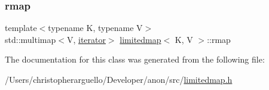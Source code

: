 \mbox{\label{classlimitedmap_ab4a6f5b1572ee3754d53f7773b381eb2}} 
\subsubsection{\texorpdfstring{rmap}{rmap}}
{\footnotesize\ttfamily template$<$typename K, typename V$>$ \\
std\+::multimap$<$V, \mbox{\hyperlink{classlimitedmap_aea661213ab6f699e9667bea25bf99821}{iterator}}$>$ \mbox{\hyperlink{classlimitedmap}{limitedmap}}$<$ K, V $>$\+::rmap\hspace{0.3cm}{\ttfamily [protected]}}



The documentation for this class was generated from the following file\+:\begin{DoxyCompactItemize}
\item 
/\+Users/christopherarguello/\+Developer/anon/src/\mbox{\hyperlink{limitedmap_8h}{limitedmap.\+h}}\end{DoxyCompactItemize}
